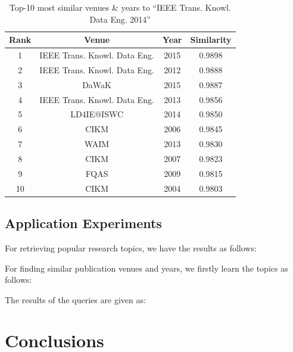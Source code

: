 \documentclass{sig-alternate-05-2015}
\begin{document}
\begin{table}
\centering
\caption{Top-10 most similar venues \& years to ``IEEE Trans. Knowl. Data Eng. 2014''} \label{tbl:app2}
\begin{tabular}{|c|c|c||c|} \hline
Rank & Venue & Year & Similarity\\ \hline
1 & IEEE Trans. Knowl. Data Eng. & 2015 & 0.9898 \\ \hline
2 & IEEE Trans. Knowl. Data Eng. & 2012 & 0.9888 \\ \hline
3 & DaWaK & 2015 & 0.9887 \\ \hline
4 & IEEE Trans. Knowl. Data Eng. & 2013 & 0.9856 \\ \hline
5 & LD4IE@ISWC & 2014 & 0.9850 \\ \hline
6 & CIKM & 2006 & 0.9845 \\ \hline
7 & WAIM & 2013 & 0.9830 \\ \hline
8 & CIKM & 2007 & 0.9823 \\ \hline
9 & FQAS & 2009 & 0.9815 \\ \hline
10 & CIKM & 2004 & 0.9803 \\ \hline
\end{tabular}
\end{table}

\subsection{Application Experiments}
For retrieving popular research topics, we have the results as follows:

For finding similar publication venues and years, we firstly learn the topics as follows:

The results of the queries are given as:
\section{Conclusions}

%

%
\end{document}
